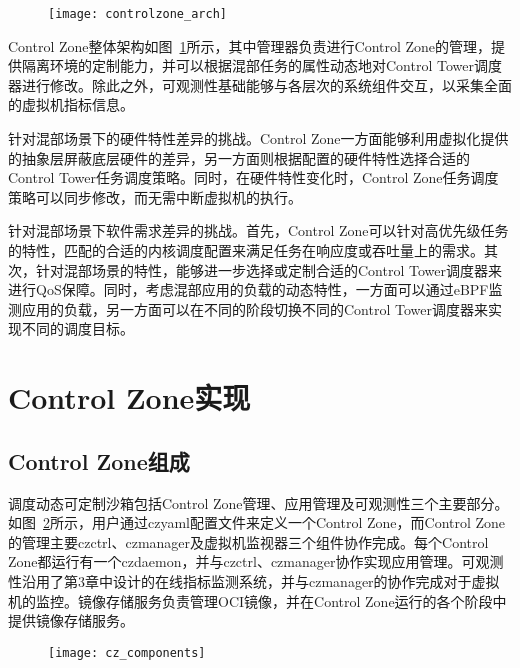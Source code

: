 \begin{figure}[!htbp]
    \centering
    \texttt{[image: controlzone\_arch]}
    \label{fig:controlzone_arch}
\end{figure}
 
Control Zone整体架构如图~\ref{fig:controlzone_arch}所示，其中管理器负责进行Control Zone的管理，提供隔离环境的定制能力，并可以根据混部任务的属性动态地对Control Tower调度器进行修改。除此之外，可观测性基础能够与各层次的系统组件交互，以采集全面的虚拟机指标信息。

针对混部场景下的硬件特性差异的挑战。Control Zone一方面能够利用虚拟化提供的抽象层屏蔽底层硬件的差异，另一方面则根据配置的硬件特性选择合适的Control Tower任务调度策略。同时，在硬件特性变化时，Control Zone任务调度策略可以同步修改，而无需中断虚拟机的执行。

针对混部场景下软件需求差异的挑战。首先，Control Zone可以针对高优先级任务的特性，匹配的合适的内核调度配置来满足任务在响应度或吞吐量上的需求。其次，针对混部场景的特性，能够进一步选择或定制合适的Control Tower调度器来进行QoS保障。同时，考虑混部应用的负载的动态特性，一方面可以通过eBPF监测应用的负载，另一方面可以在不同的阶段切换不同的Control Tower调度器来实现不同的调度目标。

\section{Control Zone实现}

\subsection{Control Zone组成}


调度动态可定制沙箱包括Control Zone管理、应用管理及可观测性三个主要部分。如图~\ref{fig:cz_components}所示，用户通过czyaml配置文件来定义一个Control Zone，而Control Zone的管理主要czctrl、czmanager及虚拟机监视器三个组件协作完成。每个Control Zone都运行有一个czdaemon，并与czctrl、czmanager协作实现应用管理。可观测性沿用了第3章中设计的在线指标监测系统，并与czmanager的协作完成对于虚拟机的监控。镜像存储服务负责管理OCI镜像，并在Control Zone运行的各个阶段中提供镜像存储服务。

\begin{figure}[!htbp]
    \centering
    \texttt{[image: cz\_components]}
    \label{fig:cz_components}
\end{figure}

